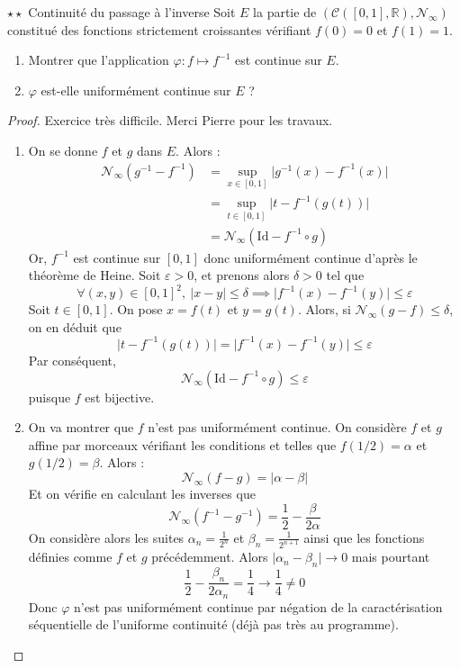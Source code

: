 \documentclass[french,a4paper]{article}
\newcommand{\R}{\mathbb{R}}
\newcommand{\inv}{^{-1}}
\theoremstyle{plain}
\theoremstyle{definition}
\theoremstyle{remark}
\begin{document}
\begin{ex}[Moulin.23]{$\star\star$ Continuité du passage à l'inverse}
	Soit $E$ la partie de $\left(\mathcal{C}([0,1],\R),\mathcal{N}_\infty\right)$ constitué des fonctions strictement croissantes vérifiant $f(0)=0$ et $f(1)=1$.
	\begin{enumerate}
		\item Montrer que l'application $\varphi:f\mapsto f\inv$ est continue sur $E$.
		\item $\varphi$ est-elle uniformément continue sur $E$ ?
	\end{enumerate}
\end{ex}
\begin{proof}
	Exercice très difficile. Merci Pierre pour les travaux.
	\begin{enumerate}
		\item On se donne $f$ et $g$ dans $E$. Alors : \begin{align*}
			\mathcal{N}_\infty(g\inv-f\inv)&=\underset{x\in[0,1]}{\sup}\lvert g\inv(x)-f\inv(x)\rvert \\
			&=\underset{t\in[0,1]}{\sup}\lvert t-f\inv(g(t))\rvert\\
			&=\mathcal{N}_\infty(\text{Id}-f\inv\circ g)
		\end{align*} Or, $f\inv$ est continue sur $[0,1]$ donc uniformément continue d'après le théorème de Heine. Soit $\varepsilon>0$, et prenons alors $\delta>0$ tel que $$\forall (x,y)\in[0,1]^2,\ \lvert x-y\rvert\leqslant\delta \implies\lvert f\inv(x)-f\inv(y)\rvert\leqslant\varepsilon$$ Soit $t\in[0,1]$. On pose $x=f(t)$ et $y=g(t)$. Alors, si $\mathcal{N}_\infty(g-f)\leqslant\delta$, on en déduit que $$\lvert t-f\inv(g(t))\rvert=\lvert f\inv(x)-f\inv(y)\rvert\leqslant\varepsilon$$ Par conséquent, $$\mathcal{N}_\infty(\text{Id}-f\inv\circ g)\leqslant\varepsilon$$ puisque $f$ est bijective.
		\item On va montrer que $f$ n'est pas uniformément continue. On considère $f$ et $g$ affine par morceaux vérifiant les conditions et telles que $f(1/2)=\alpha$ et $g(1/2)=\beta$. Alors : $$\mathcal{N}_\infty(f-g)=\lvert\alpha-\beta\rvert$$ Et on vérifie en calculant les inverses que $$\mathcal{N}_\infty(f\inv-g\inv)=\frac{1}{2}-\frac{\beta}{2\alpha}$$ On considère alors les suites $\alpha_n=\displaystyle\frac{1}{2^n}$ et $\beta_n=\displaystyle\frac{1}{2^{n+1}}$ ainsi que les fonctions définies comme $f$ et $g$ précédemment. Alors $\lvert\alpha_n-\beta_n\rvert\to0$ mais pourtant $$\frac{1}{2}-\frac{\beta_n}{2\alpha_n}=\frac{1}{4}\to\frac{1}{4}\ne0$$
		Donc $\varphi$ n'est pas uniformément continue par négation de la caractérisation séquentielle de l'uniforme continuité (déjà pas très au programme).
	\end{enumerate}
\end{proof}
\end{document}
